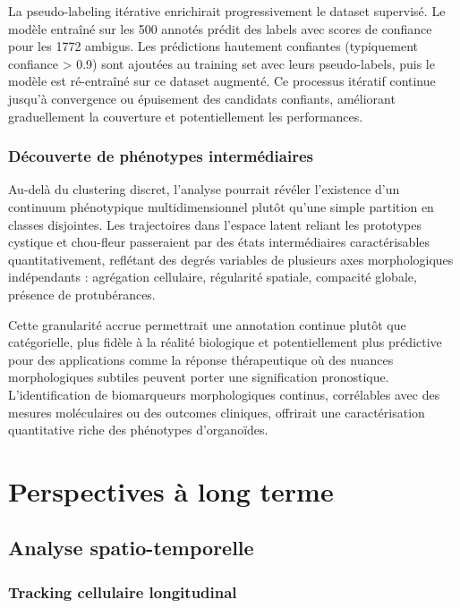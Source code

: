 La pseudo-labeling itérative enrichirait progressivement le dataset supervisé. Le modèle entraîné sur les 500 annotés prédit des labels avec scores de confiance pour les 1772 ambigus. Les prédictions hautement confiantes (typiquement confiance > 0.9) sont ajoutées au training set avec leurs pseudo-labels, puis le modèle est ré-entraîné sur ce dataset augmenté. Ce processus itératif continue jusqu'à convergence ou épuisement des candidats confiants, améliorant graduellement la couverture et potentiellement les performances.

\subsubsection{Découverte de phénotypes intermédiaires}

Au-delà du clustering discret, l'analyse pourrait révéler l'existence d'un continuum phénotypique multidimensionnel plutôt qu'une simple partition en classes disjointes. Les trajectoires dans l'espace latent reliant les prototypes cystique et chou-fleur passeraient par des états intermédiaires caractérisables quantitativement, reflétant des degrés variables de plusieurs axes morphologiques indépendants : agrégation cellulaire, régularité spatiale, compacité globale, présence de protubérances.

Cette granularité accrue permettrait une annotation continue plutôt que catégorielle, plus fidèle à la réalité biologique et potentiellement plus prédictive pour des applications comme la réponse thérapeutique où des nuances morphologiques subtiles peuvent porter une signification pronostique. L'identification de biomarqueurs morphologiques continus, corrélables avec des mesures moléculaires ou des outcomes cliniques, offrirait une caractérisation quantitative riche des phénotypes d'organoïdes.

\section{Perspectives à long terme}

\subsection{Analyse spatio-temporelle}

\subsubsection{Tracking cellulaire longitudinal}

